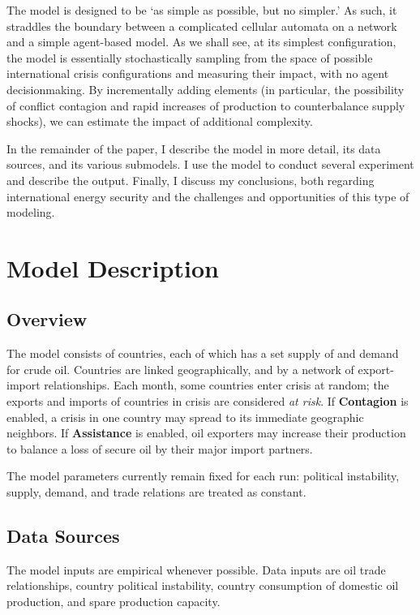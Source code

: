 \documentclass{llncs}
\begin{document}
The model is designed to be `as simple as possible, but no simpler.'  As such, it straddles the boundary between a complicated cellular automata on a network and a simple agent-based model. As we shall see, at its simplest configuration, the model is essentially stochastically sampling from the space of possible international crisis configurations and measuring their impact, with no agent decisionmaking. By incrementally adding elements (in particular, the possibility of conflict contagion and rapid increases of production to counterbalance supply shocks), we can estimate the impact of additional complexity. 

In the remainder of the paper, I describe the model in more detail, its data sources, and its various submodels. I use the model to conduct several experiment and describe the output. Finally, I discuss my conclusions, both regarding international energy security and the challenges and opportunities of this type of modeling.

\section{Model Description}

\subsection{Overview}

The model consists of countries, each of which has a set supply of and demand for crude oil. Countries are linked geographically, and by a network of export-import relationships. Each month, some countries enter crisis at random; the exports and imports of countries in crisis are considered \emph{at risk}. If \textbf{Contagion} is enabled, a crisis in one country may spread to its immediate geographic neighbors. If \textbf{Assistance} is enabled, oil exporters may increase their production to balance a loss of secure oil by their major import partners.

The model parameters currently remain fixed for each run: political instability, supply, demand, and trade relations are treated as constant. 

\subsection{Data Sources}
The model inputs are empirical whenever possible. Data inputs are oil trade relationships, country political instability,  country consumption of domestic oil production, and spare production capacity.
\end{document}
